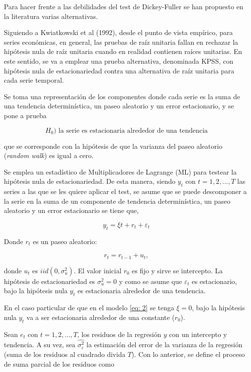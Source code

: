 Para hacer frente a las debilidades del test de Dickey-Fuller se han propuesto en la literatura varias alternativas. 

Siguiendo a Kwiatkowski et al (1992), desde el punto de vista empírico, para series económicas, en general, las pruebas de raíz unitaria fallan en rechazar la hipótesis nula de raíz unitaria cuando en realidad contienen raíces unitarias. En este sentido, se va a emplear una prueba alternativa, denominada KPSS, con hipótesis nula de estacionariedad contra una alternativa de raíz unitaria para cada serie temporal. 

Se toma una representación de los componentes donde cada serie es la suma de una tendencia determinística, un paseo aleatorio y un error estacionario, y se pone a prueba

$$H_0)\text{ la serie es estacionaria alrededor de una tendencia}$$

que se corresponde con la hipótesis de que la varianza del paseo aleatorio (\textit{random walk}) es igual a cero. 

Se emplea un estadístico de Multiplicadores de Lagrange (ML) para testear la hipótesis nula de estacionariedad. De esta manera, siendo $y_t$ con $t=1,2,...,T$ las series a las que se les quiere aplicar el test, se asume que se puede descomponer a la serie en la suma de un componente de tendencia determinística, un paseo aleatorio y un error estacionario se tiene que,

\begin{equation}
\label{eq: 2}    
y_t=\xi t + r_t + \varepsilon_t
\end{equation}

Donde $r_t$ es un paseo aleatorio:

\begin{equation}
\label{eq: 3}    
r_t = r_{t-1} + u_t,
\end{equation}

donde $u_t$ es $iid(0,\sigma_u^2)$. El valor inicial $r_0$  es fijo y sirve se intercepto. La hipótesis de estacionariedad es $\sigma_u^2=0$ y como se asume que $\varepsilon_t$ es estacionario, bajo la hipótesis nula $y_t$ es estacionaria alrededor de una tendencia.

En el caso particular de que en el modelo \eqref{eq: 2} se tenga $\xi=0$, bajo la hipótesis nula $y_t$ va a ser estacionaria alrededor de una constante ($r_0$).

Sean $e_t$ con $t=1,2,...,T$, los residuos de la regresión $y$ con un intercepto y tendencia. A su vez, sea $\hat{\sigma_\varepsilon^2}$ la estimación del error de la varianza de la regresión (suma de los residuos al cuadrado divida $T$). Con lo anterior, se define el proceso de suma parcial de los residuos como

